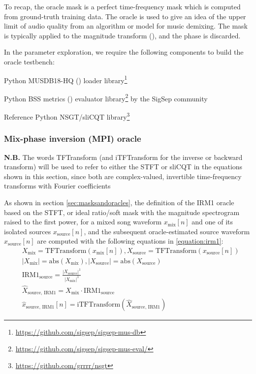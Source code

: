\documentclass[report.tex]{subfiles}
\begin{document}
To recap, the oracle mask is a perfect time-frequency mask which is computed from ground-truth training data. The oracle is used to give an idea of the upper limit of audio quality from an algorithm or model for music demixing. The mask is typically applied to the magnitude transform (\cite{umx}), and the phase is discarded.

In the parameter exploration, we require the following components to build the oracle testbench:

\begin{tight_enumerate}
	\item
		Python MUSDB18-HQ (\cite{musdb18hq}) loader library\footnote{\url{https://github.com/sigsep/sigsep-mus-db}}
	\item
		Python BSS metrics (\cite{bss}) evaluator library\footnote{\url{https://github.com/sigsep/sigsep-mus-eval/}} by the SigSep community
	\item
		Reference Python NSGT/sliCQT library\footnote{\url{https://github.com/grrrr/nsgt}}
\end{tight_enumerate}

\subsubsection{Mix-phase inversion (MPI) oracle}
\label{sec:mpi}

\textbf{N.B.} The words TFTransform (and iTFTransform for the inverse or backward transform) will be used to refer to either the STFT or sliCQT in the equations shown in this section, since both are complex-valued, invertible time-frequency transforms with Fourier coefficients

As shown in section \ref{sec:masksandoracles}, the definition of the IRM1 oracle based on the STFT, or ideal ratio/soft mask with the magnitude spectrogram raised to the first power, for a mixed song waveform $x_{\text{mix}}[n]$ and one of its isolated sources $x_{\text{source}}[n]$, and the subsequent oracle-estimated source waveform $\hat{x}_{\text{source}}[n]$ are computed with the following equations in \eqref{equation:irm1}:
\begin{align}\tag{1}\label{equation:irm1}
	\nonumber & X_{\text{mix}} = \text{TFTransform}(x_{\text{mix}}[n]), X_{\text{source}} = \text{TFTransform}(x_{\text{source}}[n])\\
	\nonumber & |X_{\text{mix}}| = \text{abs}(X_{\text{mix}}), |X_{\text{source}}| = \text{abs}(X_{\text{source}})\\
	\nonumber & \text{IRM1}_{\text{source}} = \frac{|X_{\text{source}}|^{1}}{|X_{\text{mix}}|^{1}}\\
	\nonumber & \hat{X}_{\text{source, IRM1}} = X_{\text{mix}} \cdot \text{IRM1}_{\text{source}}\\
	\nonumber & \hat{x}_{\text{source, IRM1}}[n] = \text{iTFTransform}(\hat{X}_{\text{source, IRM1}})
\end{align}
\end{document}
